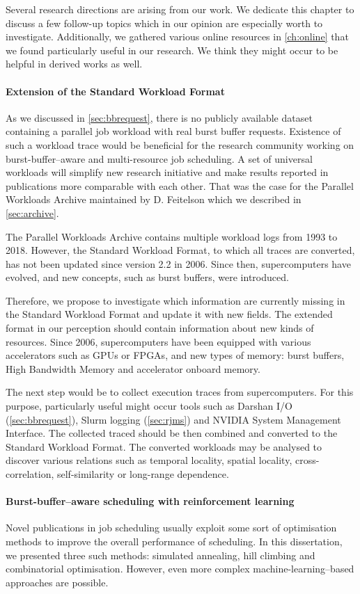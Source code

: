 \documentclass[thesis-en.tex]{subfiles}
\begin{document}
Several research directions are arising from our work. We dedicate this chapter to discuss a few follow-up topics which in our opinion are especially worth to investigate. Additionally, we gathered various online resources in \autoref{ch:online} that we found particularly useful in our research. We think they might occur to be helpful in derived works as well.

\paragraph{Extension of the Standard Workload Format}
As we discussed in \autoref{sec:bbrequest}, there is no publicly available dataset containing a parallel job workload with real burst buffer requests. Existence of such a workload trace would be beneficial for the research community working on burst-buffer--aware and multi-resource job scheduling. A set of universal workloads will simplify new research initiative and make results reported in publications more comparable with each other. That was the case for the Parallel Workloads Archive maintained by D. Feitelson which we described in \autoref{sec:archive}.

The Parallel Workloads Archive contains multiple workload logs from 1993 to 2018. However, the Standard Workload Format, to which all traces are converted, has not been updated since version 2.2 in 2006. Since then, supercomputers have evolved, and new concepts, such as burst buffers, were introduced.

Therefore, we propose to investigate which information are currently missing in the Standard Workload Format and update it with new fields. The extended format in our perception should contain information about new kinds of resources. Since 2006, supercomputers have been equipped with various accelerators such as GPUs or FPGAs, and new types of memory: burst buffers, High Bandwidth Memory and accelerator onboard memory.

The next step would be to collect execution traces from supercomputers. For this purpose, particularly useful might occur tools such as Darshan I/O (\autoref{sec:bbrequest}), Slurm logging (\autoref{sec:rjms}) and NVIDIA System Management Interface. The collected traced should be then combined and converted to the Standard Workload Format. The converted workloads may be analysed to discover various relations such as temporal locality, spatial locality, cross-correlation, self-similarity or long-range dependence.

\paragraph{Burst-buffer--aware scheduling with reinforcement learning}
Novel publications in job scheduling usually exploit some sort of optimisation methods to improve the overall performance of scheduling. In this dissertation, we presented three such methods: simulated annealing, hill climbing and combinatorial optimisation. However, even more complex machine-learning--based approaches are possible.
\end{document}
